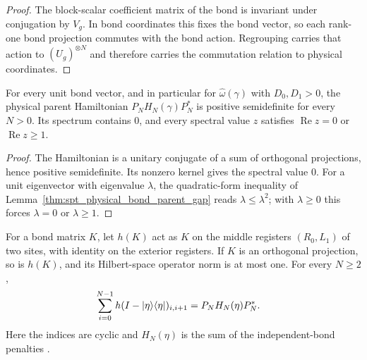\begin{proof}\leanok
    The block-scalar coefficient matrix of the bond is invariant under
    conjugation by $V_g$. In bond coordinates this fixes the bond vector,
    so each rank-one bond projection commutes with the bond action.
    Regrouping carries that action to $(U_g)^{\otimes N}$ and therefore
    carries the commutation relation to physical coordinates.
\end{proof}

\begin{lemma}
    \label{thm:spt_physical_bond_parent_spectrum}
    \leanok
    For every unit bond vector, and in particular for
    $\widehat\omega(\gamma)$ with $D_0,D_1>0$, the physical parent
    Hamiltonian $P_NH_N(\gamma)P_N^*$ is positive semidefinite for every
    $N>0$. Its spectrum contains $0$, and every spectral value $z$
    satisfies $\operatorname{Re}z=0$ or $\operatorname{Re}z\geq1$.
\end{lemma}

\begin{proof}\leanok
    The Hamiltonian is a unitary conjugate of a sum of orthogonal
    projections, hence positive semidefinite. Its nonzero kernel gives the
    spectral value $0$. For a unit eigenvector with eigenvalue $\lambda$,
    the quadratic-form inequality of
    Lemma~\ref{thm:spt_physical_bond_parent_gap} reads
    $\lambda\leq\lambda^2$; with $\lambda\geq0$ this forces $\lambda=0$ or
    $\lambda\geq1$.
\end{proof}

\begin{lemma}
    \label{thm:spt_two_site_bond_interaction}
    \leanok
    For a bond matrix $K$, let $h(K)$ act as $K$ on the middle
    registers $(R_0,L_1)$ of two sites, with identity on the exterior
    registers. If $K$ is an orthogonal projection, so is $h(K)$, and
    its Hilbert-space operator norm is at most one. For every $N\geq2$,
    \begin{align}
        \sum_{i=0}^{N-1}h(I-|\eta\rangle\langle\eta|)_{i,i+1}
         & =P_N H_N(\eta)P_N^*.
        \notag
    \end{align}
    Here the indices are cyclic and $H_N(\eta)$ is the sum of the
    independent-bond penalties
    \cite[Section~II.D.2]{Schuch2011Phases}.
\end{lemma}

